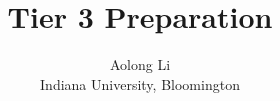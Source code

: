 \documentclass{article}
\title{\sffamily\bfseries Tier 3 Preparation}
\author{Aolong Li \\
 {\small Indiana University, Bloomington}}
\affil{}
\date{}
\begin{document}
\begin{CJK*}{UTF8}{gbsn}
\maketitle
\vspace{3pt}

\newpage



\newpage 


\end{CJK*}
\end{document}
